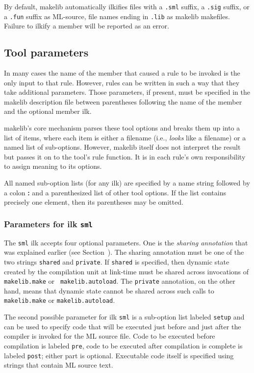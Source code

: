 By default, makelib automatically ilkifies files with a {\tt .sml}
suffix, a {\tt .sig} suffix, or a {\tt .fun} suffix as ML-source, file
names ending in {\tt .lib} as makelib makefiles.  Failure to ilkify a
member will be reported as an error.

\subsection{Tool parameters}
\label{sec:toolparam}

In many cases the name of the member that caused a rule to be invoked
is the only input to that rule.  However, rules can be written in such
a way that they take additional parameters.  Those parameters, if
present, must be specified in the makelib description file between
parentheses following the name of the member and the optional member
ilk.

makelib's core mechanism parses these tool options and breaks them up into
a list of items, where each item is either a filename (i.e., {\em
looks} like a filename) or a named list of sub-options.  However, makelib
itself does not interpret the result but passes it on to the tool's
rule function.  It is in each rule's own responsibility to assign
meaning to its options.

All named sub-option lists (for any ilk) are specified by a name
string followed by a colon {\bf :} and a parenthesized list of other
tool options.  If the list contains precisely one element, then its
parentheses may be omitted.

\subsubsection{Parameters for ilk {\tt sml}}
\label{sec:toolparam:sml}

The {\tt sml} ilk accepts four optional parameters.  One is the {\em
sharing annotation} that was explained earlier (see
Section~).  The sharing annotation must be one of the
two strings {\tt shared} and {\tt private}.  If {\tt shared} is
specified, then dynamic state created by the compilation unit at
link-time must be shared across invocations of {\tt makelib.make} or {\tt
makelib.autoload}.  The {\tt private} annotation, on the other hand, means
that dynamic state cannot be shared across such calls to {\tt makelib.make}
or {\tt makelib.autoload}.

The second possible parameter for ilk {\tt sml} is a sub-option
list labeled {\tt setup} and can be used to specify code that will be
executed just before and just after the compiler is invoked for the
ML source file.  Code to be executed before compilation is labeled
{\tt pre}, code to be executed after compilation is complete is
labeled {\tt post}; either part is optional.  Executable code itself
is specified using strings that contain ML source text.

